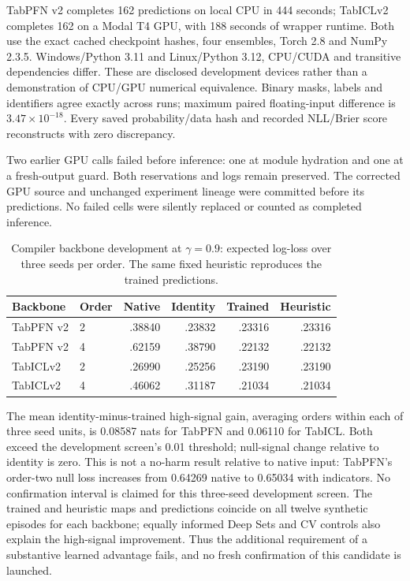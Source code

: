 \documentclass[10pt]{article}
\begin{document}
TabPFN v2 completes 162 predictions on local CPU in 444 seconds; TabICLv2 completes 162 on a Modal T4 GPU, with 188 seconds of wrapper runtime. Both use the exact cached checkpoint hashes, four ensembles, Torch 2.8 and NumPy 2.3.5. Windows/Python 3.11 and Linux/Python 3.12, CPU/CUDA and transitive dependencies differ. These are disclosed development devices rather than a demonstration of CPU/GPU numerical equivalence. Binary masks, labels and identifiers agree exactly across runs; maximum paired floating-input difference is $3.47\times10^{-18}$. Every saved probability/data hash and recorded NLL/Brier score reconstructs with zero discrepancy.

Two earlier GPU calls failed before inference: one at module hydration and one at a fresh-output guard. Both reservations and logs remain preserved. The corrected GPU source and unchanged experiment lineage were committed before its predictions. No failed cells were silently replaced or counted as completed inference.

\begin{table}[t]
\centering\small
\caption{Compiler backbone development at $\gamma=0.9$: expected log-loss over three seeds per order. The same fixed heuristic reproduces the trained predictions.}
\label{tab:compiler_backbone}
\begin{tabular}{@{}llrrrr@{}}\toprule
Backbone & Order & Native & Identity & Trained & Heuristic\\\midrule
TabPFN v2 & 2 & .38840 & .23832 & .23316 & .23316\\
TabPFN v2 & 4 & .62159 & .38790 & .22132 & .22132\\
TabICLv2 & 2 & .26990 & .25256 & .23190 & .23190\\
TabICLv2 & 4 & .46062 & .31187 & .21034 & .21034\\\bottomrule
\end{tabular}
\end{table}

The mean identity-minus-trained high-signal gain, averaging orders within each of three seed units, is 0.08587 nats for TabPFN and 0.06110 for TabICL. Both exceed the development screen's 0.01 threshold; null-signal change relative to identity is zero. This is not a no-harm result relative to native input: TabPFN's order-two null loss increases from 0.64269 native to 0.65034 with indicators. No confirmation interval is claimed for this three-seed development screen. The trained and heuristic maps and predictions coincide on all twelve synthetic episodes for each backbone; equally informed Deep Sets and CV controls also explain the high-signal improvement. Thus the additional requirement of a substantive learned advantage fails, and no fresh confirmation of this candidate is launched.
\end{document}
